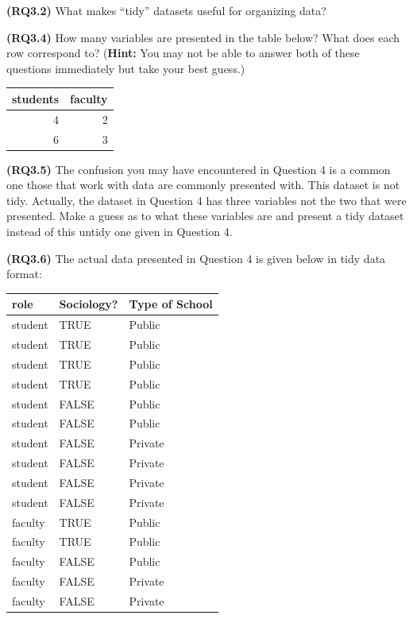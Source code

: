 \documentclass[]{tufte-book}
\begin{document}
\textbf{(RQ3.2)} What makes ``tidy'' datasets useful for organizing
data?

\textbf{(RQ3.4)} How many variables are presented in the table below?
What does each row correspond to? (\textbf{Hint:} You may not be able to
answer both of these questions immediately but take your best guess.)

\begin{tabular}{r|r}
\hline
students & faculty\\
\hline
4 & 2\\
\hline
6 & 3\\
\hline
\end{tabular}

\textbf{(RQ3.5)} The confusion you may have encountered in Question 4 is
a common one those that work with data are commonly presented with. This
dataset is not tidy. Actually, the dataset in Question 4 has three
variables not the two that were presented. Make a guess as to what these
variables are and present a tidy dataset instead of this untidy one
given in Question 4.

\textbf{(RQ3.6)} The actual data presented in Question 4 is given below
in tidy data format:

\begin{tabular}{l|l|l}
\hline
role & Sociology? & Type of School\\
\hline
student & TRUE & Public\\
\hline
student & TRUE & Public\\
\hline
student & TRUE & Public\\
\hline
student & TRUE & Public\\
\hline
student & FALSE & Public\\
\hline
student & FALSE & Public\\
\hline
student & FALSE & Private\\
\hline
student & FALSE & Private\\
\hline
student & FALSE & Private\\
\hline
student & FALSE & Private\\
\hline
faculty & TRUE & Public\\
\hline
faculty & TRUE & Public\\
\hline
faculty & FALSE & Public\\
\hline
faculty & FALSE & Private\\
\hline
faculty & FALSE & Private\\
\hline
\end{tabular}
\end{document}
